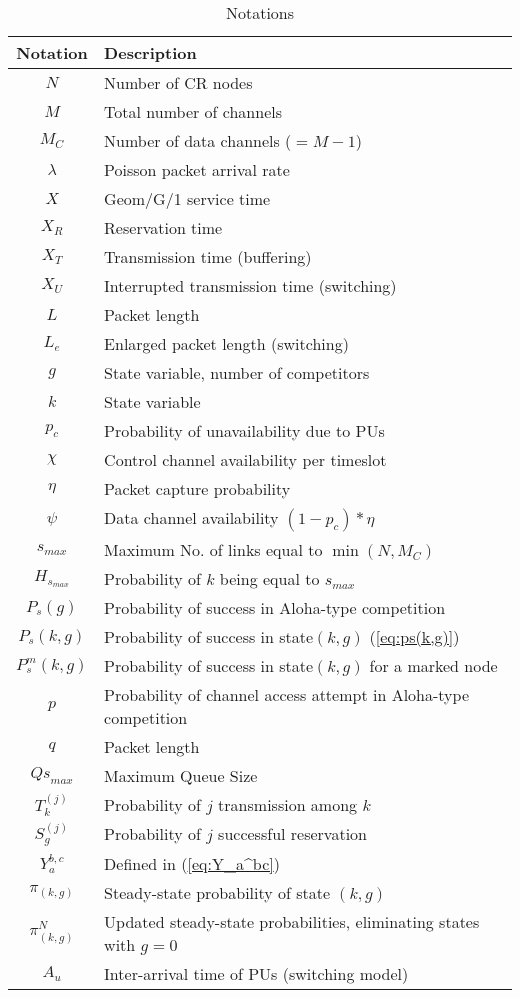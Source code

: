 \documentclass[12pt,journal,oneside,onecolumn]{IEEEtran}
\begin{document}
\begin{table}[]
\caption{{Notations}}
\label{tab:notations}
\centering
\begin{tabular} {c|l}
\hline
\scriptsize
{\textbf{Notation}} & {\textbf {Description}} \\
 \hline
$N$& Number of CR nodes\\
$M$& Total number of channels\\
$M_C$& Number of data channels ($=M-1$)\\
$\lambda$& Poisson packet arrival rate\\
$X$& Geom/G/1 service time \\
$X_R$& Reservation time \\
$X_T$& Transmission time (buffering) \\
$X_U$& Interrupted transmission time (switching) \\
$L$& Packet length \\
$L_e$& Enlarged packet length (switching) \\
$g$& State variable, number of competitors\\
$k$& State variable\\
$p_c$    & Probability of unavailability due to PUs\\
$\chi$&Control channel availability per timeslot\\
$\eta$&Packet capture probability\\
$\psi$&Data channel availability $(1-p_c)*\eta$\\
$s_{max}$& Maximum No. of links equal to $\min(N, M_C)$\\
$H_{s_{max}}$& Probability of $k$ being equal to $s_{max}$\\
$P_s(g)$& Probability of success in Aloha-type competition \\
$P_s(k,g)$& Probability of success in state$(k,g)$ (\ref{eq:ps(k,g)}) \\
$P^m_s(k,g)$& Probability of success in state$(k,g)$ for a marked node\\
$p$& Probability of channel access attempt in Aloha-type competition\\
$q$& Packet length\\
${Qs}_{max}$& Maximum Queue Size\\
$T_k^{(j)}$& Probability of $j$ transmission among $k$\\
$S_g^{(j)}$& Probability of $j$ successful reservation\\
$Y_{a}^{b,c}$& Defined in (\ref{eq:Y_a^bc})\\
$\pi_{(k,g)}$& Steady-state probability of state $(k,g)$\\
$\pi^{N}_{(k,g)}$& Updated steady-state probabilities, eliminating states with $g=0$\\
$A_u$& Inter-arrival time of PUs (switching model)\\
\hline
\end{tabular}
\normalsize
\end{table}
\normalsize
\end{document}

